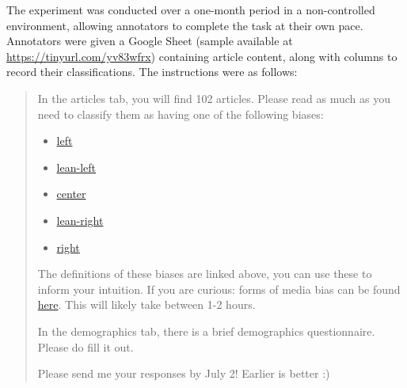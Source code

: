 The experiment was conducted over a one-month period in a non-controlled environment, allowing annotators to complete the task at their own pace. Annotators were given a Google Sheet (sample available at \url{https://tinyurl.com/yv83wfrx}) containing article content, along with columns to record their classifications. The instructions were as follows:

\begin{quote}
In the articles tab, you will find 102 articles. Please read as much as you need to classify them as having one of the following biases:
\begin{itemize}
    \item \href{https://www.allsides.com/media-bias/left}{left}
    \item \href{https://www.allsides.com/media-bias/left-center}{lean-left}
    \item \href{https://www.allsides.com/media-bias/center}{center}
    \item \href{https://www.allsides.com/media-bias/right-center}{lean-right}
    \item \href{https://www.allsides.com/media-bias/right}{right}
\end{itemize}

The definitions of these biases are linked above, you can use these to inform your intuition. If you are curious: forms of media bias can be found \href{https://www.allsides.com/media-bias/how-to-spot-types-of-media-bias}{here}. This will likely take between 1-2 hours.

In the demographics tab, there is a brief demographics questionnaire. Please do fill it out.

Please send me your responses by July 2! Earlier is better :)
\end{quote}

